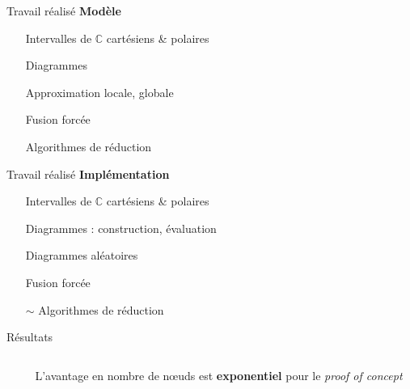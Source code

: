 \documentclass[french, 12pt]{beamer}
\begin{document}
\begin{frame}{Travail réalisé}
\textbf{Modèle}
\begin{itemize}
    \item[\checkmark] Intervalles de $\mathbb C$ cartésiens \& polaires
    \item[\checkmark] Diagrammes
    \item[\checkmark] Approximation locale, globale
    \item[\checkmark] Fusion forcée
    \item[\checkmark] Algorithmes de réduction
\end{itemize}
\end{frame}

\begin{frame}{Travail réalisé}
    \textbf{Implémentation}
    \begin{itemize}
        \item[\checkmark] Intervalles de $\mathbb C$ cartésiens \& polaires
        \item[\checkmark] Diagrammes : construction, évaluation
        \item[\checkmark] Diagrammes aléatoires
        \item[\checkmark] Fusion forcée
        \item[$\sim$] Algorithmes de réduction
    \end{itemize}
\end{frame}

\begin{frame}{Résultats}
    \begin{columns}
        \begin{column}{0.6\textwidth}
                \end{column}
        \begin{column}{0.4\textwidth}
            L'avantage en nombre de nœuds est \textbf{exponentiel} pour le \textit{proof of concept}
        \end{column}
    \end{columns}
\end{frame}
\end{document}
